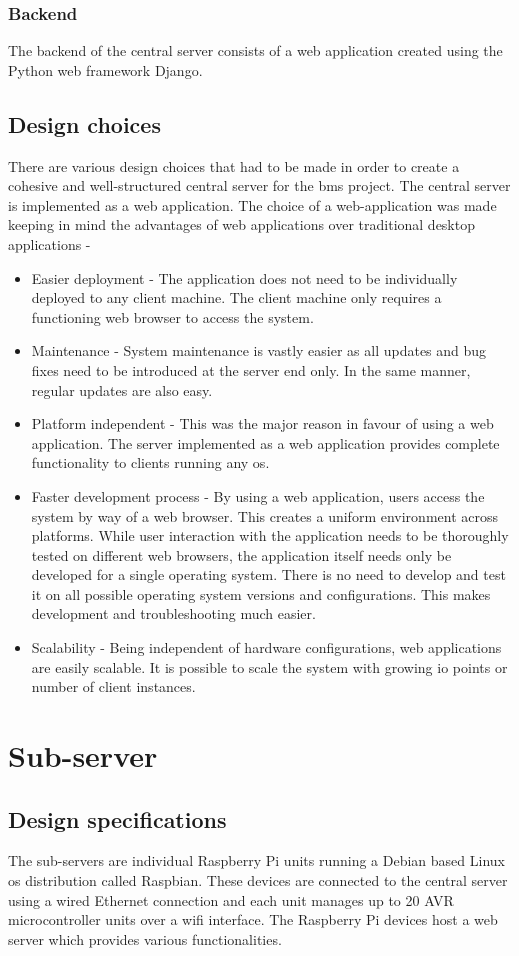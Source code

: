 \documentclass[letterpaper,11pt]{report}
\begin{document}
\subsubsection{Backend}
The backend of the central server consists of a web application created using the Python web framework Django.
\subsection{Design choices}
There are various design choices that had to be made in order to create a cohesive and well-structured central server for the \ac{bms} project. The central server is implemented as a web application. The choice of a web-application was made keeping in mind the advantages of web applications over traditional desktop applications -
\begin{itemize}
    \item Easier deployment - The application does not need to be individually deployed to any client machine. The client machine only requires a functioning web browser to access the system.
    \item Maintenance - System maintenance is vastly easier as all updates and bug fixes need to be introduced at the server end only. In the same manner, regular updates are also easy.
    \item Platform independent - This was the major reason in favour of using a web application. The server implemented as a web application provides complete functionality to clients running any \ac{os}.
    \item Faster development process - By using a web application, users access the system by way of a web browser. This creates a uniform environment across platforms. While user interaction with the application needs to be thoroughly tested on different web browsers, the application itself needs only be developed for a single operating system. There is no need to develop and test it on all possible operating system versions and configurations. This makes development and troubleshooting much easier.
    \item Scalability - Being independent of hardware configurations, web applications are easily scalable. It is possible to scale the system with growing \ac{io} points or number of client instances.
\end{itemize}
\section{Sub-server}
\subsection{Design specifications}
The sub-servers are individual Raspberry Pi units running a Debian based Linux \ac{os} distribution called Raspbian. These devices are connected to the central server using a wired Ethernet connection and each unit manages up to 20 AVR microcontroller units over a \ac{wifi} interface. The Raspberry Pi devices host a web server which provides various functionalities.
\end{document}
